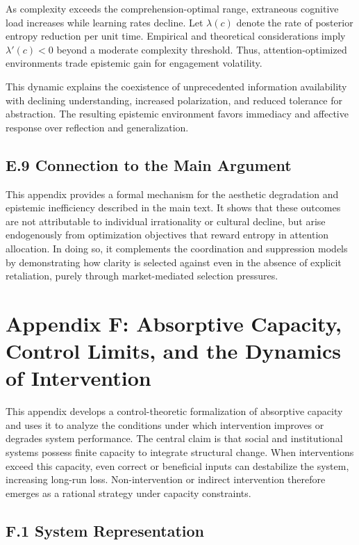 \documentclass[11pt]{article}
\begin{document}
As complexity exceeds the comprehension-optimal range, extraneous cognitive load increases while learning rates decline. Let \(\lambda(c)\) denote the rate of posterior entropy reduction per unit time. Empirical and theoretical considerations imply \(\lambda'(c) < 0\) beyond a moderate complexity threshold. Thus, attention-optimized environments trade epistemic gain for engagement volatility.

This dynamic explains the coexistence of unprecedented information availability with declining understanding, increased polarization, and reduced tolerance for abstraction. The resulting epistemic environment favors immediacy and affective response over reflection and generalization.

\subsection{E.9 Connection to the Main Argument}

This appendix provides a formal mechanism for the aesthetic degradation and epistemic inefficiency described in the main text. It shows that these outcomes are not attributable to individual irrationality or cultural decline, but arise endogenously from optimization objectives that reward entropy in attention allocation. In doing so, it complements the coordination and suppression models by demonstrating how clarity is selected against even in the absence of explicit retaliation, purely through market-mediated selection pressures.

\section{Appendix F: Absorptive Capacity, Control Limits, and the Dynamics of Intervention}
\label{app:absorptive-detailed}

This appendix develops a control-theoretic formalization of absorptive capacity and uses it to analyze the conditions under which intervention improves or degrades system performance. The central claim is that social and institutional systems possess finite capacity to integrate structural change. When interventions exceed this capacity, even correct or beneficial inputs can destabilize the system, increasing long-run loss. Non-intervention or indirect intervention therefore emerges as a rational strategy under capacity constraints.

\subsection{F.1 System Representation}
\end{document}
